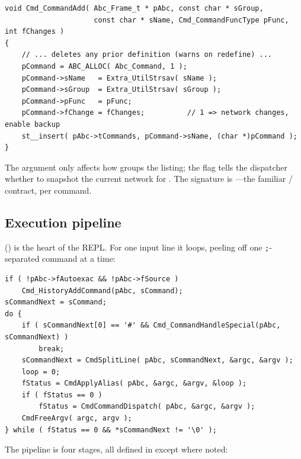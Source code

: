 \begin{lstlisting}[style=abccode]
void Cmd_CommandAdd( Abc_Frame_t * pAbc, const char * sGroup,
                     const char * sName, Cmd_CommandFuncType pFunc, int fChanges )
{
    // ... deletes any prior definition (warns on redefine) ...
    pCommand = ABC_ALLOC( Abc_Command, 1 );
    pCommand->sName   = Extra_UtilStrsav( sName );
    pCommand->sGroup  = Extra_UtilStrsav( sGroup );
    pCommand->pFunc   = pFunc;
    pCommand->fChange = fChanges;          // 1 => network changes, enable backup
    st__insert( pAbc->tCommands, pCommand->sName, (char *)pCommand );
}
\end{lstlisting}

The  argument only affects how  groups the listing; the
 flag tells the dispatcher whether to snapshot the current network
for . The signature  is
---the familiar /
contract, per command.

\subsection{Execution pipeline}

 () is the heart of the
REPL. For one input line it loops, peeling off one \texttt{;}-separated command
at a time:

\begin{lstlisting}[style=abccode]
if ( !pAbc->fAutoexac && !pAbc->fSource )
    Cmd_HistoryAddCommand(pAbc, sCommand);
sCommandNext = sCommand;
do {
    if ( sCommandNext[0] == '#' && Cmd_CommandHandleSpecial(pAbc, sCommandNext) )
        break;
    sCommandNext = CmdSplitLine( pAbc, sCommandNext, &argc, &argv );
    loop = 0;
    fStatus = CmdApplyAlias( pAbc, &argc, &argv, &loop );
    if ( fStatus == 0 )
        fStatus = CmdCommandDispatch( pAbc, &argc, &argv );
    CmdFreeArgv( argc, argv );
} while ( fStatus == 0 && *sCommandNext != '\0' );
\end{lstlisting}

The pipeline is four stages, all defined in 
except where noted:

